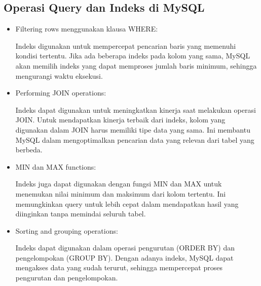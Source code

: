 \documentclass{article}
\begin{document}
\subsection{Operasi Query dan Indeks di MySQL}
\begin{itemize}
    \item Filtering rows menggunakan klausa WHERE:

          Indeks digunakan untuk mempercepat pencarian baris yang memenuhi kondisi tertentu. Jika ada beberapa indeks pada kolom yang sama, MySQL akan memilih indeks yang dapat memproses jumlah baris minimum, sehingga mengurangi waktu eksekusi.

    \item Performing JOIN operations:

          Indeks dapat digunakan untuk meningkatkan kinerja saat melakukan operasi JOIN. Untuk mendapatkan kinerja terbaik dari indeks, kolom yang digunakan dalam JOIN harus memiliki tipe data yang sama. Ini membantu MySQL dalam mengoptimalkan pencarian data yang relevan dari tabel yang berbeda.

    \item MIN dan MAX functions:

          Indeks juga dapat digunakan dengan fungsi MIN dan MAX untuk menemukan nilai minimum dan maksimum dari kolom tertentu. Ini memungkinkan query untuk lebih cepat dalam mendapatkan hasil yang diinginkan tanpa memindai seluruh tabel.

    \item Sorting and grouping operations:

          Indeks dapat digunakan dalam operasi pengurutan (ORDER BY) dan pengelompokan (GROUP BY). Dengan adanya indeks, MySQL dapat mengakses data yang sudah terurut, sehingga mempercepat proses pengurutan dan pengelompokan.
\end{itemize}
\end{document}
